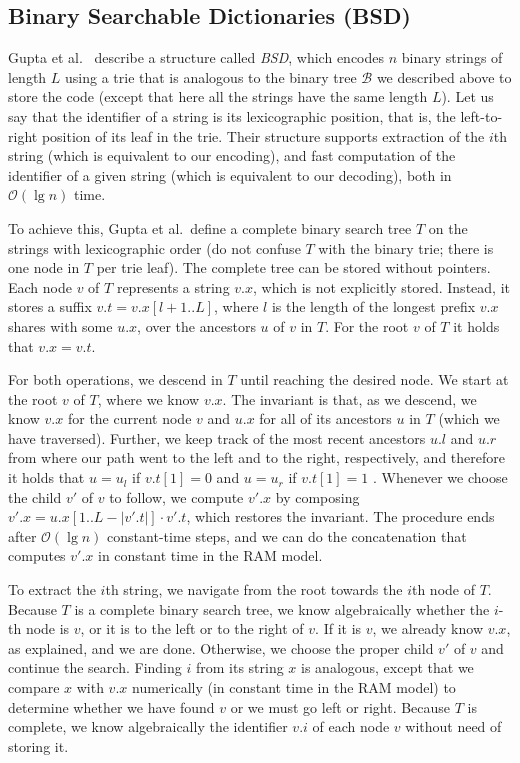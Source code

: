 \documentclass[preprint,12pt]{elsarticle}
\newcommand{\Oh}[1]{\ensuremath{\mathcal{O}\!\left({#1}\right)}}
\newcommand{\B}{\mathcal{B}}
\renewcommand{\log}{\lg}
\begin{document}
\subsection{Binary Searchable Dictionaries (BSD)}

Gupta et al.~\cite{GHSV07} describe a structure called {\em BSD}, which encodes
$n$ binary strings of length $L$ using a trie that is analogous to the binary 
tree $\B$ we described above to store the code (except that here all the strings
have the same length $L$). Let us say that the identifier of a string is its 
lexicographic position, that is, the left-to-right position of its leaf in the
trie. Their structure supports extraction of the $i$th string (which is 
equivalent to our encoding), and fast computation of the identifier of a given 
string (which is equivalent to our decoding), both in $\Oh{\log n}$ time.

To achieve this, Gupta et al.\ define a complete binary search tree $T$ on the 
strings with lexicographic order (do not confuse $T$ with the binary trie;
there is one node in $T$ per trie leaf). The complete tree can be stored 
without pointers. Each node $v$ of $T$ represents a string $v.x$, which is not 
explicitly stored. Instead, it stores a suffix $v.t = v.x[l+1..L]$, 
where $l$ is the length of the longest prefix $v.x$ shares with some $u.x$, 
over the ancestors $u$ of $v$ in $T$. For the root $v$ of $T$ it holds that
$v.x = v.t$.

For both operations, we descend in $T$ until reaching the desired node.
We start at the root $v$ of $T$, where we know $v.x$. The invariant is that, as
we descend, we know $v.x$ for the current node $v$ and $u.x$ for all of its 
ancestors $u$ in $T$ (which we have traversed).
Further, we keep track of the most recent ancestors $u.l$ and $u.r$ from where 
our path went to the left and to the right, respectively, and therefore it 
holds that $u=u_l$ if $v.t[1]=0$ and $u=u_r$ if $v.t[1]=1$ \cite{GHSV07}.
Whenever we choose the child $v'$ of $v$ to follow, we compute
$v'.x$ by composing $v'.x = u.x[1..L-|v'.t|] \cdot v'.t$, which restores 
the invariant. The procedure ends after $\Oh{\log n}$ constant-time steps, and
we can do the concatenation that computes $v'.x$ in constant time in the RAM 
model.

To extract the $i$th string, we navigate from the root towards the $i$th node
of $T$. Because $T$ is a complete binary search tree, we know algebraically 
whether the $i$-th node is $v$, or it is to the left or to the right of $v$. 
If it is $v$, we already know $v.x$, as explained, and we are done. Otherwise, 
we choose the proper child $v'$ of $v$ and continue the search.
Finding $i$ from its string $x$ is analogous, except that we compare $x$ with
$v.x$ numerically (in constant time in the RAM model) to determine whether we
have found $v$ or we must go left or right. Because $T$ is complete, we know
algebraically the identifier $v.i$ of each node $v$ without need of storing it.
\end{document}
